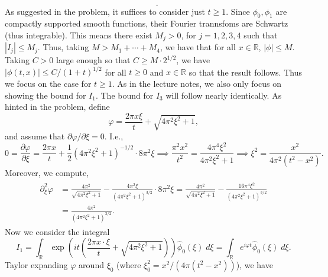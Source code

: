 \documentclass{article}
\begin{document}
\begin{enumerate}[itemsep =-2pt,label = (\alph{*})]
\begin{equation*}
\begin{matrix}
		\end{matrix}
		. 
	\end{equation*} 
	As suggested in the problem, it suffices to consider just $t\geq 1$. Since $\phi_{0}, \phi_{1}$ are compactly supported smooth functions, their Fourier trannsfoms are Schwartz (thus integrable). This means there exist $M_{j} > 0$, for $j = 1, 2, 3, 4$ such that $|I_{j}| \leq M_{j}$. Thus, taking $M > M_{1} + \dotsm + M_{4}$, we have that for all $x \in \mathbb{R}$, $|\phi| \leq M$. Taking $C > 0$ large enough so that $C \geq M \cdot 2^{1/2}$, we have $|\phi(t, x)| \leq C/(1 + t)^{1/2}$ for all $t \geq 0$ and $x \in \mathbb{R}$ so that the result follows. Thus we focus on the case for $t\geq 1$. As in the lecture notes, we also only focus on showing the bound for $I_{1}$. The bound for $I_{3}$ will follow nearly identically. As hinted in the problem, define 
	\begin{equation*}
		\varphi = \frac{2\pi x \xi}{t} + \sqrt{4\pi^{2}\xi^{2} + 1}, 
	\end{equation*}
	and assume that $\partial\varphi/\partial\xi = 0$. I.e., 
	\begin{equation*}
		0 = \frac{\partial \varphi}{\partial \xi} = \frac{2\pi x}{t} + \frac{1}{2}(4\pi^{2}\xi^{2} + 1)^{-1/2} \cdot 8\pi^{2}\xi \implies \frac{\pi^{2}x^{2}}{t^{2}} = \frac{4\pi^{4}\xi^{2}}{4\pi^{2}\xi^{2} + 1}  \implies \xi^{2} = \frac{x^{2}}{4\pi^{2}(t^{2} - x^{2})}. 
	\end{equation*} 
	Moreover, we compute, 
	\begin{align*}
		\begin{split}
			\partial^{2}_{\xi}\varphi &= \frac{4\pi^{2}}{\sqrt{4\pi^{2}\xi^{2} + 1}} -\frac{4\pi^{2}\xi}{(4\pi^{2}\xi^{2} + 1)^{3/2}} \cdot 8\pi^{2}\xi = \frac{4\pi^{2}}{\sqrt{4\pi^{2}\xi^{2} + 1}} - \frac{16\pi^{4}\xi^{2}}{(4\pi^{2}\xi^{2} + 1)^{3/2}} \\
			&= \frac{4\pi^{2}}{(4\pi^{2}\xi^{2} + 1)^{3/2}}. 
		\end{split} 
	\end{align*} 
	Now we consider the integral 
	\begin{equation*}
		I_{1} = \int_{\mathbb{R}}\exp\left(it\left(\frac{2\pi x \cdot \xi}{t} + \sqrt{4\pi^{2}\xi^{2} + 1}\right)\right) \hat{\phi}_{0}(\xi)\;d\xi = \int_{\mathbb{R}}e^{i\varphi t}\hat{\phi}_{0}(\xi)\;d\xi. 
	\end{equation*} 
	Taylor expanding $\varphi$ around $\xi_{0}$ (where $\xi_{0}^{2} = x^{2}/(4\pi(t^{2} - x^{2}))$), we have 
	\begin{equation*}

\end{equation*}
\end{enumerate}
\end{document}
